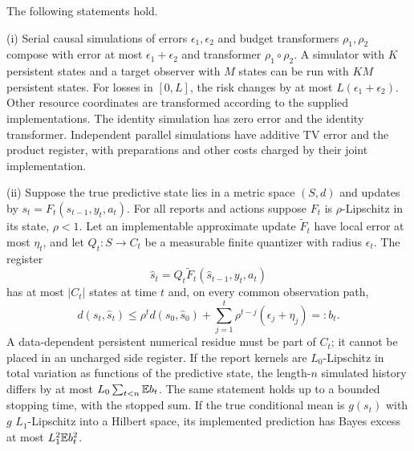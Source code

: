 \begin{theorem}
\label{thm:v7-transport}
The following statements hold.

\smallskip\noindent
\textup{(i)} Serial causal simulations of errors $\epsilon_1,\epsilon_2$
and budget transformers $\rho_1,\rho_2$ compose with error at most
$\epsilon_1+\epsilon_2$ and transformer $\rho_1\circ\rho_2$.
A simulator with $K$ persistent states and a target observer with $M$
states can be run with $KM$ persistent states. For losses in $[0,L]$,
the risk changes by at most $L(\epsilon_1+\epsilon_2)$. Other resource
coordinates are transformed according to the supplied implementations.
The identity simulation has zero error and the identity transformer.
Independent parallel simulations have additive TV error and the product
register, with preparations and other costs charged by their joint implementation.

\smallskip\noindent
\textup{(ii)} Suppose the true predictive state lies in a metric space
$(S,d)$ and updates by $s_t=F_t(s_{t-1},y_t,a_t)$. For all reports and
actions suppose $F_t$ is $\rho$-Lipschitz in its state, $\rho<1$.
Let an implementable approximate update $\widetilde F_t$ have local
error at most $\eta_t$, and let $Q_t:S\to C_t$ be a measurable finite
quantizer with radius $\epsilon_t$. The register
\begin{equation}
 \widehat s_t=Q_t\widetilde F_t(\widehat s_{t-1},y_t,a_t) 
                                                               \label{eq:v7-recursion}
\end{equation}
has at most $|C_t|$ states at time $t$ and, on every common observation
path,
\begin{equation}
 d(s_t,\widehat s_t)\le \rho^t d(s_0,\widehat s_0)
       +\sum_{j=1}^t\rho^{t-j}(\epsilon_j+\eta_j)=:b_t. 
                                                               \label{eq:v7-error}
\end{equation}
A data-dependent persistent numerical residue must be part of $C_t$;
it cannot be placed in an uncharged side register.
If the report kernels are $L_0$-Lipschitz in total variation as functions
of the predictive state, the length-$n$ simulated history differs by at
most $L_0\sum_{t<n}\mathbb E b_t$. The same statement holds up to a bounded
stopping time, with the stopped sum. If the true conditional mean is
$g(s_t)$ with $g$ $L_1$-Lipschitz into a Hilbert space, its implemented
prediction has Bayes excess at most $L_1^2\mathbb E b_t^2$.
\end{theorem}
